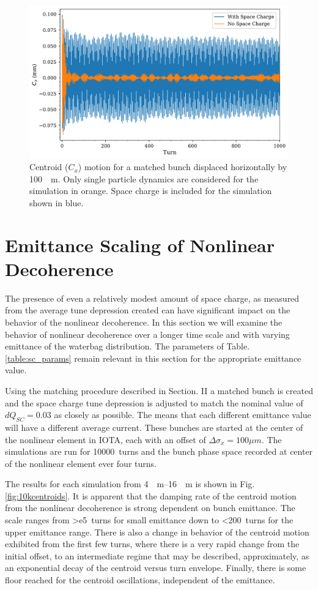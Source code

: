 \documentclass[aps,prstab,twocolumn, groupedaddress]{revtex4-1}
\begin{document}
\begin{figure}
	\includegraphics[width=\columnwidth]{sc-zc_centroid_motion_xoffset-100um.pdf}%
	\caption{\label{fig:sc_on-off} Centroid ($C_x$) motion for a matched bunch displaced 
		horizontally by \SI{100}{\mu m}. Only single particle dynamics are considered for the 
		simulation in orange. Space charge is included for the simulation shown in blue.}
\end{figure}

\section{Emittance Scaling of Nonlinear Decoherence}

The presence of even a relatively modest amount of space charge, as measured from the 
average tune depression created can have significant impact on the behavior of the 
nonlinear decoherence. In this section we will examine the behavior of nonlinear 
decoherence over a longer time scale and with varying emittance of the waterbag 
distribution. The parameters of Table. \ref{table:sc_params} remain relevant in this section 
for the appropriate emittance value. 

Using the matching procedure described in Section. II a matched bunch is created and the 
space charge tune depression is adjusted to match the nominal value of $dQ_{SC} = 
0.03$ as closely as possible. The means that each different emittance value will have a 
different average current. These bunches are started at the center of the nonlinear 
element in IOTA, each with an offset of $\Delta \sigma_x = 100 \mu m$. The simulations 
are run for \SI{10000}{turns} and the bunch phase space recorded at center of the 
nonlinear element ever four turns. 

The results for each simulation from \SIrange{4}{16}{\mu m} is shown in Fig. 
\ref{fig:10kcentroids}. It is apparent that the damping rate of the centroid motion from the 
nonlinear decoherence is strong dependent on bunch emittance. The scale ranges from 
\SI{>e5}{turns} for small emittance down to \SI{<200}{turns} for the upper emittance 
range. There is also a change in behavior of the centroid motion exhibited from the first 
few turns, where there is a very rapid change from the initial offset, to an intermediate 
regime that may be described, approximately, as an exponential decay of the centroid 
versus turn envelope. Finally, there is some floor reached for the centroid oscillations, 
independent of the emittance.
\end{document}
